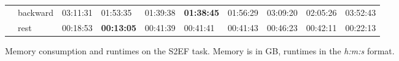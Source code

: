 \begin{figure}[H]
{\begin{tabular}{ll|l|l|l|l|l|l|l|l|}
    \multicolumn{1}{|l|}{}                          & backward    & 03:11:31 & 01:53:35          & 01:39:38       & \textbf{01:38:45} & 01:56:29 & 03:09:20      & 02:05:26 & 03:52:43          \\ \cline{2-10} 
    \multicolumn{1}{|l|}{}                          & rest        & 00:18:53 & \textbf{00:13:05} & 00:41:39       & 00:41:41          & 00:41:43 & 00:46:23      & 00:42:11 & 00:22:13          \\ \hline
    \end{tabular}}

    \captionsetup{width=\dimexpr\textwidth-1.5cm\relax}
    \caption{Memory consumption and runtimes on the S2EF task. 
    Memory is in GB, runtimes in the \textit{h:m:s} format.}
    \label{fig:gemnet-s2ef}
    
\end{figure}

